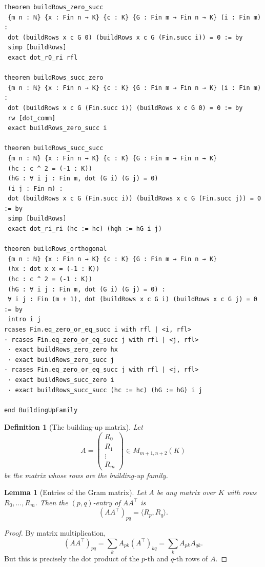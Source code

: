 \documentclass[12pt]{article}
\newtheorem{defn}{Definition}[section]
\newtheorem{lemma}[theorem]{Lemma}
\begin{document}
\begin{lstlisting}[caption={Lean verification for Theorem~\ref{thm:buildrows-orth}.}]
theorem buildRows_zero_succ
 {m n : ℕ} {x : Fin n → K} {c : K} {G : Fin m → Fin n → K} (i : Fin m) :
 dot (buildRows x c G 0) (buildRows x c G (Fin.succ i)) = 0 := by
 simp [buildRows]
 exact dot_r0_ri rfl

theorem buildRows_succ_zero
 {m n : ℕ} {x : Fin n → K} {c : K} {G : Fin m → Fin n → K} (i : Fin m) :
 dot (buildRows x c G (Fin.succ i)) (buildRows x c G 0) = 0 := by
 rw [dot_comm]
 exact buildRows_zero_succ i

theorem buildRows_succ_succ
 {m n : ℕ} {x : Fin n → K} {c : K} {G : Fin m → Fin n → K}
 (hc : c ^ 2 = (-1 : K))
 (hG : ∀ i j : Fin m, dot (G i) (G j) = 0)
 (i j : Fin m) :
 dot (buildRows x c G (Fin.succ i)) (buildRows x c G (Fin.succ j)) = 0 := by
 simp [buildRows]
 exact dot_ri_ri (hc := hc) (hgh := hG i j)

theorem buildRows_orthogonal
 {m n : ℕ} {x : Fin n → K} {c : K} {G : Fin m → Fin n → K}
 (hx : dot x x = (-1 : K))
 (hc : c ^ 2 = (-1 : K))
 (hG : ∀ i j : Fin m, dot (G i) (G j) = 0) :
 ∀ i j : Fin (m + 1), dot (buildRows x c G i) (buildRows x c G j) = 0 := by
 intro i j
rcases Fin.eq_zero_or_eq_succ i with rfl | <i, rfl>
· rcases Fin.eq_zero_or_eq_succ j with rfl | <j, rfl>
 · exact buildRows_zero_zero hx
 · exact buildRows_zero_succ j
· rcases Fin.eq_zero_or_eq_succ j with rfl | <j, rfl>
 · exact buildRows_succ_zero i
 · exact buildRows_succ_succ (hc := hc) (hG := hG) i j

end BuildingUpFamily
\end{lstlisting}

\begin{defn}[The building-up matrix]
\label{def:buildrows-matrix}
Let
\[
A=
\begin{pmatrix}
R_0\\
R_1\\
\vdots\\
R_m
\end{pmatrix}
\in M_{m+1,n+2}(K)
\]
be the matrix whose rows are the building-up family.
\end{defn}

\begin{lemma}[Entries of the Gram matrix]
\label{lem:gram-entry-dot}
Let $A$ be any matrix over $K$ with rows $R_0,\dots,R_m$. Then the $(p,q)$-entry of $AA^\top$ is
\[
(AA^\top)_{pq} = \langle R_p,R_q\rangle.
\]
\end{lemma}

\begin{proof}
By matrix multiplication,
\[
(AA^\top)_{pq}
=
\sum_k A_{pk}(A^\top)_{kq}
=
\sum_k A_{pk}A_{qk}.
\]
But this is precisely the dot product of the $p$-th and $q$-th rows of $A$.
\end{proof}
\end{document}
